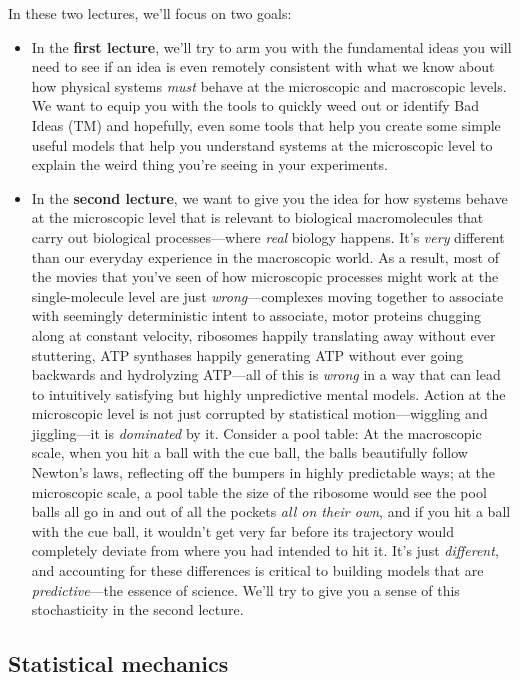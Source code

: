 \documentclass[english,course]{lecture}
\begin{document}
In these two lectures, we'll focus on two goals:
\begin{itemize}
\item In the {\bf first lecture}, we'll try to arm you with the fundamental ideas you will need to see if an idea is even remotely consistent with what we know about how physical systems \emph{must} behave at the microscopic and macroscopic levels. We want to equip you with the tools to quickly weed out or identify Bad Ideas (TM) and hopefully, even some tools that help you create some simple useful models that help you understand systems at the microscopic level to explain the weird thing you're seeing in your experiments.
\item In the {\bf second lecture}, we want to give you the idea for how systems behave at the microscopic level that is relevant to biological macromolecules that carry out biological processes---where \emph{real} biology happens. It's \emph{very} different than our everyday experience in the macroscopic world. As a result, most of the movies that you've seen of how microscopic processes might work at the single-molecule level are just \emph{wrong}---complexes moving together to associate with seemingly deterministic intent to associate, motor proteins chugging along at constant velocity, ribosomes happily translating away without ever stuttering, ATP synthases happily generating ATP without ever going backwards and hydrolyzing ATP---all of this is \emph{wrong} in a way that can lead to intuitively satisfying but highly unpredictive mental models. Action at the microscopic level is not just corrupted by statistical motion---wiggling and jiggling---it is \emph{dominated} by it. Consider a pool table: At the macroscopic scale, when you hit a ball with the cue ball, the balls beautifully follow Newton's laws, reflecting off the bumpers in highly predictable ways; at the microscopic scale, a pool table the size of the ribosome would see the pool balls all go in and out of all the pockets \emph{all on their own}, and if you hit a ball with the cue ball, it wouldn't get very far before its trajectory would completely deviate from where you had intended to hit it. It's just \emph{different}, and accounting for these differences is critical to building models that are \emph{predictive}---the essence of science. We'll try to give you a sense of this stochasticity in the second lecture.
\end{itemize}

\vfill
\eject

\subsection{Statistical mechanics}
\end{document}
